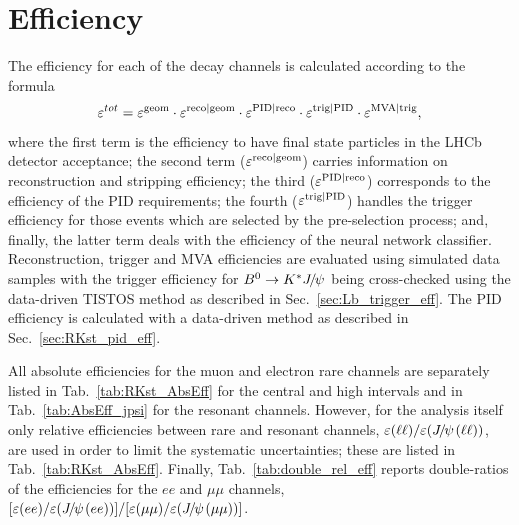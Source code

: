 \section{Efficiency}
\label{sec:RKst_efficiency}

The efficiency for each of the decay channels is calculated according to the formula
%
$$\varepsilon^{tot} = \varepsilon^{\rm geom} \cdot \varepsilon^{\rm reco|geom} \cdot \varepsilon^{\rm PID|reco} \cdot \varepsilon^{\rm trig|PID} \cdot \varepsilon^{\rm MVA|trig},$$
%
where the first term is the efficiency to have final state particles in the LHCb detector 
acceptance; the second term ($\varepsilon^{\rm reco|geom}$) carries information on reconstruction and stripping efficiency;
the third ($\varepsilon^{\rm PID|reco}$) corresponds to the efficiency of the PID requirements;
the fourth ($\varepsilon^{\rm trig|PID}$) handles the trigger efficiency for those events which
are selected by the pre-selection process; and, finally, the latter term deals with the efficiency of the neural network classifier.
Reconstruction, trigger and MVA efficiencies are evaluated using simulated data samples with the trigger efficiency
for $\Bz\to\Kstar\jpsi$ being cross-checked using the data-driven TISTOS method as described in Sec.~\ref{sec:Lb_trigger_eff}.
The PID efficiency is calculated with a data-driven method as described in Sec.~\ref{sec:RKst_pid_eff}.

All absolute efficiencies for the muon and electron rare channels are separately listed in Tab.~\ref{tab:RKst_AbsEff}
for the central and high \qsq intervals and in Tab.~\ref{tab:AbsEff_jpsi} for the resonant channels.
However, for the analysis itself only relative efficiencies between rare and resonant channels, 
$\varepsilon(\ell\ell)/\varepsilon(\jpsi(\ell\ell))$, are used in order to limit the systematic uncertainties;
these are listed in Tab.~\ref{tab:RKst_AbsEff}.
%
%
Finally, Tab.~\ref{tab:double_rel_eff} reports double-ratios of the efficiencies
for the $ee$ and $\mu\mu$ channels, $[\varepsilon(ee)/\varepsilon(\jpsi (ee))] / [\varepsilon(\mu\mu)/\varepsilon(\jpsi(\mu\mu))]$.


